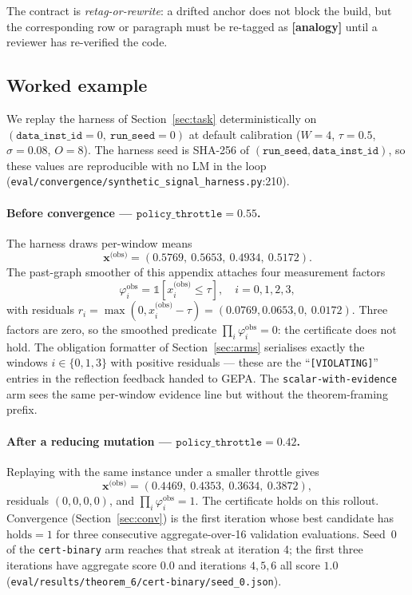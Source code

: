 The contract is \emph{retag-or-rewrite}: a drifted anchor does not
block the build, but the corresponding row or paragraph must be
re-tagged as \textbf{[analogy]} until a reviewer has re-verified
the code.

\subsection{Worked example}\label{sec:fg-worked-example}

We replay the harness of Section~\ref{sec:task} deterministically on
$(\texttt{data\_inst\_id}{=}0,\ \texttt{run\_seed}{=}0)$ at default
calibration ($W=4$, $\tau=0.5$, $\sigma=0.08$, $O=8$).  The harness
seed is SHA-256 of $(\texttt{run\_seed}, \texttt{data\_inst\_id})$,
so these values are reproducible with no LM in the loop
(\texttt{eval/convergence/synthetic\_signal\_harness.py}:210).

\paragraph{Before convergence --- $\mathtt{policy\_throttle}=0.55$.}
The harness draws per-window means
\[
\mathbf{x}^{\text{(obs)}} = (0.5769,\ 0.5653,\ 0.4934,\ 0.5172).
\]
The past-graph smoother of this appendix attaches four measurement
factors
\[
\varphi^{\text{obs}}_i = \mathbb{1}[x_i^{\text{(obs)}} \le \tau],
\quad i = 0,1,2,3,
\]
with residuals $r_i = \max(0, x_i^{\text{(obs)}} - \tau) = (0.0769,
0.0653, 0,\ 0.0172)$.  Three factors are zero, so the smoothed
predicate $\prod_i \varphi^{\text{obs}}_i = 0$: the certificate does
not hold.  The obligation formatter of Section~\ref{sec:arms}
serialises exactly the windows $i \in \{0,1,3\}$ with positive
residuals --- these are the ``\texttt{[VIOLATING]}'' entries in the
reflection feedback handed to GEPA.  The
\texttt{scalar-with-evidence} arm sees the same per-window evidence
line but without the theorem-framing prefix.

\paragraph{After a reducing mutation --- $\mathtt{policy\_throttle}=0.42$.}
Replaying with the same instance under a smaller throttle gives
\[
\mathbf{x}^{\text{(obs)}} = (0.4469,\ 0.4353,\ 0.3634,\ 0.3872),
\]
residuals $(0,0,0,0)$, and $\prod_i \varphi^{\text{obs}}_i = 1$.
The certificate holds on this rollout.  Convergence
(Section~\ref{sec:conv}) is the first iteration whose best
candidate has $\mathrm{holds}=1$ for three consecutive
aggregate-over-16 validation evaluations.  Seed~0 of the
\texttt{cert-binary} arm reaches that streak at iteration 4; the
first three iterations have aggregate score $0.0$ and iterations
$4,5,6$ all score $1.0$
(\texttt{eval/results/theorem\_6/cert-binary/seed\_0.json}).

